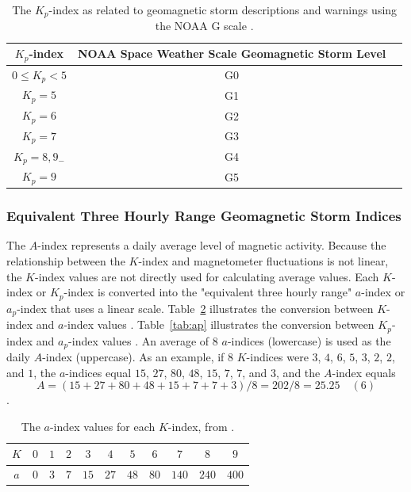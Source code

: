 \documentclass[sn-mathphys-num]{sn-jnl}%
\begin{document}
\begin{table}[!ht]
    \centering
    \caption{The $K_{p}$-index as related to geomagnetic storm descriptions and warnings using the NOAA G scale \cite{NOAA2024eSpace, NOAA2024fScales}.}
    \label{tab:Kp}
    \begin{tabular}{|c|c|c|}
        \hline
        $K_{p}$-index & NOAA Space Weather Scale Geomagnetic Storm Level \\ \hline
        $0\leq K_{p}<5$ & G0 \\ \hline
        $K_{p}=5$ & G1 \\ \hline
        $K_{p}=6$ & G2 \\ \hline
        $K_{p}=7$ & G3 \\ \hline
        $K_{p}=8, 9_{-}$ & G4 \\ \hline
        $K_{p}=9$ & G5 \\ \hline
    \end{tabular}
\end{table}

\subsubsection{Equivalent Three Hourly Range Geomagnetic Storm Indices}

The $A$-index \cite{NOAA2024gGeomagneticIndices} represents a daily average level of magnetic activity. Because the relationship between the $K$-index and magnetometer fluctuations is not linear, the $K$-index values are not directly used for calculating average values. Each $K$-index or $K_{p}$-index is converted into the "equivalent three hourly range" $a$-index or $a_{p}$-index that uses a linear scale. Table~\ref{tab:a} illustrates the conversion between $K$-index and $a$-index values \cite{NOAA2024bKindex}. Table~\ref{tab:ap} illustrates the conversion between $K_{p}$-index and $a_{p}$-index values \cite{NOAA2024gGeomagneticIndices}. An average of $8$ $a$-indices (lowercase) is used as the daily $A$-index (uppercase). As an example, if $8$ $K$-indices were $3$, $4$, $6$, $5$, $3$, $2$, $2$, and $1$, the $a$-indices equal $15$, $27$, $80$, $48$, $15$, $7$, $7$, and $3$, and the $A$-index equals \begin{equation}
	A = (15 + 27 + 80 + 48 + 15 + 7 + 7 + 3)/8 = 202 / 8 = 25.25
	\quad\left(6\right)
\end{equation}.

\begin{table}[!ht]
    \centering
    \caption{The $a$-index values for each $K$-index, from \cite{NOAA2024bKindex}.}
    \label{tab:a}
    \begin{tabular}{|c|c|c|c|c|c|c|c|c|c|c|}
        \hline
        $K$ & $0$ & $1$ & $2$ & $3$ & $4$ & $5$ & $6$ & $7$ & $8$ & $9$ \\ \hline
        $a$ & $0$ & $3$ & $7$ & $15$ & $27$ & $48$ & $80$ & $140$ & $240$ & $400$ \\ \hline
    \end{tabular}
\end{table}
\end{document}
